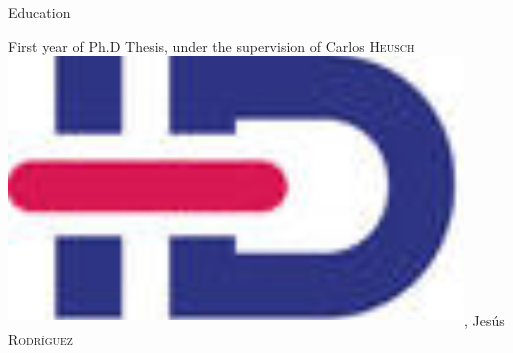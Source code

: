  \begin{rubric}{Education}
                                \entry*[2020-2021]
                            
                    
                                \entry*
                            
                    
                                \entry*[2019-2020]
                            
                    
                                \entry*
                            
                    
                                \entry*[2018-2019]
                            First year of Ph.D Thesis, under the supervision of
                            Carlos
                            \textsc{Heusch}\href{https://www.idref.fr/055838413}{\textsuperscript{\includegraphics[scale=0.025]{img/idref.png}}}, Jesús \textsc{Rodríguez
}
\end{rubric}
